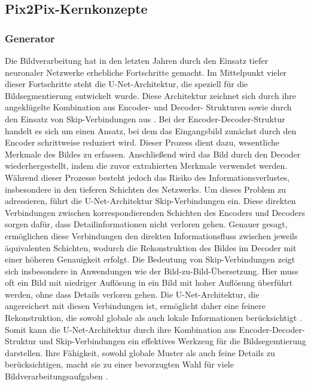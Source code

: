 \subsection{Pix2Pix-Kernkonzepte}
\subsubsection{Generator}
Die Bildverarbeitung hat in den letzten Jahren durch den Einsatz tiefer neuronaler Netzwerke erhebliche Fortschritte gemacht. Im Mittelpunkt vieler dieser Fortschritte steht die U-Net-Architektur, die speziell für die Bildsegmentierung entwickelt wurde. Diese Architektur zeichnet sich durch ihre angeklügelte Kombination aus Encoder- und Decoder- Strukturen sowie durch den Einsatz von Skip-Verbindungen aus \cite{Isola}. 
 \newline
Bei der Encoder-Decoder-Struktur handelt es sich um einen Ansatz, bei dem das Eingangsbild zunächst durch den Encoder schrittweise reduziert wird. Dieser Prozess dient dazu, wesentliche Merkmale des Bildes zu erfassen. Anschließend wird das Bild durch den Decoder wiederhergestellt, indem die zuvor extrahierten Merkmale verwendet werden. Während dieser Prozesse besteht jedoch das Risiko des Informationsverlustes, insbesondere in den tieferen Schichten des Netzwerks.
Um dieses Problem zu adressieren, führt die U-Net-Architektur Skip-Verbindungen ein. Diese direkten Verbindungen zwischen korrespondierenden Schichten des Encoders und Decoders sorgen dafür, dass Detailinformationen nicht verloren gehen. Genauer gesagt, ermöglichen diese Verbindungen den direkten Informationsfluss zwischen jeweils äquivalenten Schichten, wodurch die Rekonstruktion des Bildes im Decoder mit einer höheren Genauigkeit erfolgt\cite{Isola}. \newline
Die Bedeutung von Skip-Verbindungen zeigt sich insbesondere in Anwendungen wie der Bild-zu-Bild-Übersetzung. Hier muss oft ein Bild mit niedriger Auflösung in ein Bild mit hoher Auflösung überführt werden, ohne dass Details verloren gehen. Die U-Net-Architektur, die angereichert mit diesen Verbindungen ist, ermöglicht daher eine feinere Rekonstruktion, die sowohl globale als auch lokale Informationen berücksichtigt \cite{Isola}.  \newline
Somit kann die U-Net-Architektur durch ihre Kombination aus Encoder-Decoder-Struktur und Skip-Verbindungen ein effektives Werkzeug für die Bildsegemtierung darstellen. Ihre Fähigkeit, sowohl globale Muster als auch feine Details zu berücksichtigen, macht sie zu einer bevorzugten Wahl für viele Bildverarbeitungsaufgaben \cite{Isola}. \newline
